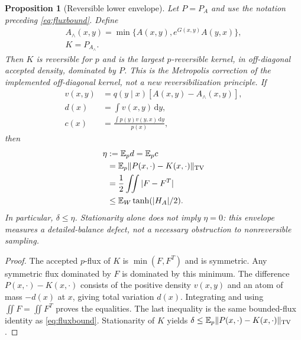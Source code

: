 \documentclass[pdflatex,iicol,sn-mathphys-ay]{sn-jnl}
\newtheorem{proposition}[theorem]{Proposition}
\theoremstyle{definition}\newtheorem{definition}[theorem]{Definition}
\theoremstyle{remark}\newtheorem{remark}[theorem]{Remark}
\numberwithin{equation}{section}
\newcommand{\dd}{\,\mathrm d}\newcommand{\cA}{c_\alpha}\newcommand{\sg}{\operatorname{sigmoid}}
\newcommand{\1}{\mathbf 1}
\begin{document}
\begin{proposition}[Reversible lower envelope]\label{prop:envelope}
Let $P=P_A$ and use the notation preceding \eqref{eq:fluxbound}. Define
\begin{equation}
\begin{gathered}
 A_\wedge(x,y)=\min\{A(x,y),e^{G(x,y)}A(y,x)\},\\
K=P_{A_\wedge}.
\end{gathered}\label{eq:envelope}
\end{equation}
Then $K$ is reversible for $p$ and is the largest $p$-reversible kernel, in off-diagonal accepted density, dominated by $P$. This is the Metropolis correction of the implemented off-diagonal kernel, not a new reversibilization principle. If
\[
\begin{aligned}
 v(x,y)&=q(y\mid x)[A(x,y)-A_\wedge(x,y)],\\
 d(x)&=\int v(x,y)\dd y,\\
 c(x)&=\frac{\int p(y)v(y,x)\dd y}{p(x)},
\end{aligned}
\]
then
\begin{equation}
\begin{aligned}
 \eta&:=\mathbb E_p d=\mathbb E_p c\\
 &=\mathbb E_p\|P(x,\cdot)-K(x,\cdot)\|_{\mathrm{TV}}\\
 &=\frac12\iint|F-F^T|\\
 &\le\mathbb E_W\tanh(|H_A|/2).
\end{aligned}\label{eq:envelopeerror}
\end{equation}
In particular, $\delta\le\eta$. Stationarity alone does not imply $\eta=0$: this envelope measures a detailed-balance defect, not a necessary obstruction to nonreversible sampling.
\end{proposition}
\begin{proof}
The accepted $p$-flux of $K$ is $\min(F,F^T)$ and is symmetric. Any symmetric flux dominated by $F$ is dominated by this minimum. The difference $P(x,\cdot)-K(x,\cdot)$ consists of the positive density $v(x,y)$ and an atom of mass $-d(x)$ at $x$, giving total variation $d(x)$. Integrating and using $\iint F=\iint F^T$ proves the equalities. The last inequality is the same bounded-flux identity as \eqref{eq:fluxbound}. Stationarity of $K$ yields $\delta\le\mathbb E_p\|P(x,\cdot)-K(x,\cdot)\|_{\mathrm{TV}}$.
\end{proof}
\end{document}
